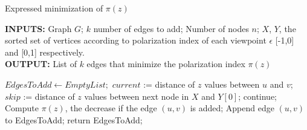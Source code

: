 \begin{algorithm}[htbp]
	\caption{Expressed minimization of $\pi(z)$}
	\label{alg:ExpressedAlgo}
	\begin{flushleft}
        		\textbf{INPUTS:} Graph $G$; $k$ number of edges to add; Number of nodes $n$;
		$X$, $Y $, the sorted set of vertices according to polarization index of each viewpoint $\epsilon$ [-1,0] and [0,1] respectively.\\
		\vspace{6pt}
        		\textbf{OUTPUT:} List of $k$ edges that minimize the polarization index $\pi(z)$
	\end{flushleft}
	\begin{algorithmic}[1]
		\STATE $EdgesToAdd \leftarrow Empty List;$
			\STATE $current$ := distance of $z$ values between $u$ and $v$;
			\STATE $skip$ := distance of $z$ values between next node in $X$ and $Y[0]$;
				\STATE continue;
			\ENDIF
		\STATE Compute $\pi(z)$, the decrease if the edge $(u,v)$ is added;
		\STATE Append edge $(u,v)$ to EdgesToAdd;
			\STATE return EdgesToAdd;
		\ENDIF
		\ENDFOR
		\ENDFOR
	\end{algorithmic}
\end{algorithm}

\clearpage



